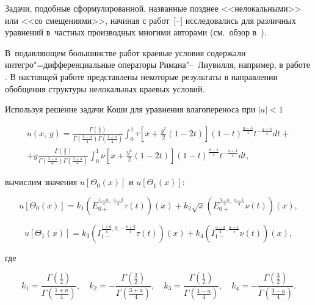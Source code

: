 \smallskip



Задачи, подобные сформулированной, названные позднее <<нелокальными>> или <<со смещениями>>, начиная с работ~[--]  исследовались для различных уравнений в~частных производных многими авторами (см.~обзор в~\cite{arl:bib:4}). 

В~подавляющем большинстве работ краевые условия содержали интегро"=дифференциальные операторы Римана"--~Лиувилля, например, в работе \cite{arl:bib:16}. В настоящей работе представлены некоторые результаты в направлении обобщения структуры нелокальных краевых условий.



Используя решение задачи Коши для уравнения влагопереноса при ${|a|<1}$ \cite[с. 261]{arl:bib:5}

\begin{multline*}

u(x,\,y)=\frac{\Gamma\left(\frac12\right)}{\Gamma\left(\frac{1-a}{4}\right)\Gamma\left(\frac{1+a}{4}\right)}\int^{1}_{0}\tau\left[x+\frac{y^2}{2}\left(1-2t\right)\right]\left(1-t\right)^{\frac{a-3}{4}}t^{-\frac{a+3}{4}}dt+

\\+y\frac{\Gamma\left(\frac32\right)}{\Gamma\left(\frac{3-a}{4}\right)\Gamma\left(\frac{3+a}{4}\right)}\int^{1}_{0}\nu\left[x+\frac{y^2}{2}\left(1-2t\right)\right]\left(1-t\right)^{\frac{a-1}{4}}t^{-\frac{a+1}{4}}dt,


\end{multline*}

вычислим значения $u[\Theta_0(x)]$ и $u[\Theta_1(x)]$:

$$

u[\Theta_0(x)]=k_1\left(E^{\frac{1-a}{4},\,\frac{a-3}{4}}_{0+}\tau(t)\right)(x)+k_2\sqrt{x}\left(E^{\frac{3-a}{4},\,\frac{a-1}{4}}_{0+}\nu(t)\right)(x),

$$

$$

u[\Theta_1(x)]=k_3\left(I^{\frac{1+a}{4}, 0, -\frac{a+3}{4}}_{1-}\tau(t)\right)(x)+k_4\left(I^{\frac{3-a}{4}, \frac{a-1}{4}}_{1-}\nu(t)\right)(x),

$$

где 

$$k_1=\frac{\Gamma\left(\frac12\right)}{\Gamma\left(\frac{1+a}{4}\right)},

\quad  k_2=-\frac{\Gamma\left(\frac32\right)}{\Gamma\left(\frac{3+a}{4}\right)},\quad  k_3=\frac{\Gamma\left(\frac12\right)}{\Gamma\left(\frac{1-a}{4}\right)},\quad  k_4=-\frac{\Gamma\left(\frac32\right)}{\Gamma\left(\frac{3-a}{4}\right)}.$$

